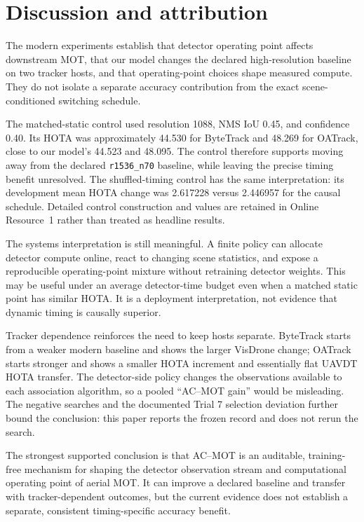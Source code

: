 \section{Discussion and attribution}
The modern experiments establish that detector operating point affects
downstream MOT, that our model changes the declared high-resolution baseline on
two tracker hosts, and that operating-point choices shape measured compute.
They do not isolate a separate accuracy contribution from the exact
scene-conditioned switching schedule.

The matched-static control used resolution 1088, NMS IoU 0.45, and confidence
0.40. Its HOTA was approximately 44.530 for ByteTrack and 48.269 for OATrack,
close to our model's 44.523 and 48.095. The control therefore supports moving
away from the declared \texttt{r1536\_n70} baseline, while leaving the precise
timing benefit unresolved. The shuffled-timing control has the same
interpretation: its development mean HOTA change was 2.617228 versus 2.446957
for the causal schedule. Detailed control construction and values are retained
in Online Resource~1 rather than treated as headline results.

The systems interpretation is still meaningful. A finite policy can allocate
detector compute online, react to changing scene statistics, and expose a
reproducible operating-point mixture without retraining detector weights. This
may be useful under an average detector-time budget even when a matched static
point has similar HOTA. It is a deployment interpretation, not evidence that
dynamic timing is causally superior.

Tracker dependence reinforces the need to keep hosts separate. ByteTrack starts
from a weaker modern baseline and shows the larger VisDrone change; OATrack
starts stronger and shows a smaller HOTA increment and essentially flat UAVDT
HOTA transfer. The detector-side policy changes the observations available to
each association algorithm, so a pooled ``AC--MOT gain'' would be misleading.
The negative searches and the documented Trial 7 selection deviation further
bound the conclusion: this paper reports the frozen record and does not rerun
the search.

The strongest supported conclusion is that AC--MOT is an auditable,
training-free mechanism for shaping the detector observation stream and
computational operating point of aerial MOT. It can improve a declared
baseline and transfer with tracker-dependent outcomes, but the current evidence
does not establish a separate, consistent timing-specific accuracy benefit.
